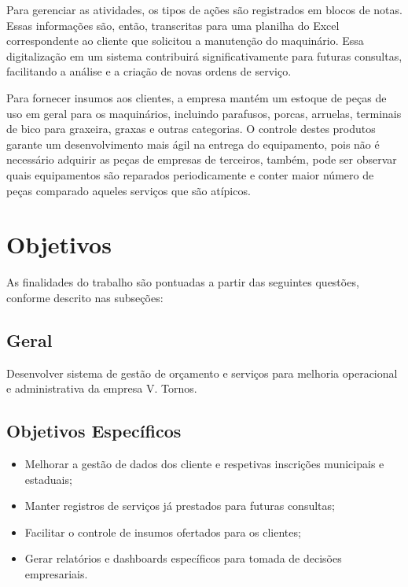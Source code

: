 Para gerenciar as atividades, os tipos de ações são registrados em blocos de notas. Essas informações são, então, transcritas para uma planilha do Excel correspondente ao cliente que solicitou a manutenção do maquinário. Essa digitalização em um sistema contribuirá significativamente para futuras consultas, facilitando a análise e a criação de novas ordens de serviço.

Para fornecer insumos aos clientes, a empresa mantém um estoque de peças de uso em geral para os maquinários, incluindo parafusos, porcas, arruelas, terminais de bico para graxeira, graxas e outras categorias. O controle destes produtos garante um desenvolvimento mais ágil na entrega do equipamento, pois não é necessário adquirir as peças de empresas de terceiros, também, pode ser observar quais equipamentos são reparados periodicamente e conter maior número de peças comparado aqueles serviços que são atípicos.

\section{Objetivos}

As finalidades do trabalho são pontuadas a partir das seguintes questões, conforme descrito nas subseções:

\subsection{Geral}
\label{sub:objtivo_geral}

Desenvolver sistema de gestão de orçamento e serviços para melhoria operacional e administrativa da empresa V. Tornos.

\subsection{Objetivos Específicos}
\label{sub:objetivos_especificos}

\begin{itemize}
   \item Melhorar a gestão de dados dos cliente e respetivas inscrições municipais e estaduais;
   \item Manter registros de serviços já prestados para futuras consultas;
   \item Facilitar o controle de insumos ofertados para os clientes;
   \item  Gerar relatórios e dashboards específicos para tomada de decisões empresariais.
\end{itemize}